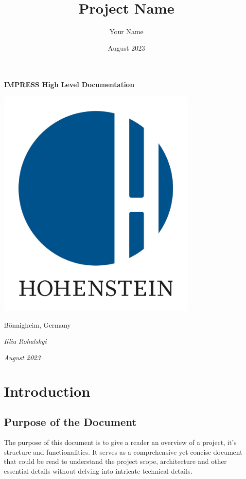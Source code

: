 \documentclass{report}
\title{Project Name}
\author{Your Name}
\date{August 2023}
\begin{document}
\begin{titlepage}
    \centerline{\Huge\textbf{IMPRESS High Level Documentation}}
    
    \vspace*{2cm}
    
    \centerline{\includegraphics[width=10cm]{hohenstein logo.jpg}}
    
    \vspace*{1.5cm}
    
    \centerline{\LARGE Bönnigheim, Germany}
    
    \vspace*{1cm}
    
    \centerline{\Large\textit{Illia Rohalskyi}}
    
    \vspace*{0.5cm}
    
    \centerline{\Large\textit{August 2023}}
    
\end{titlepage}

\tableofcontents
\chapter{Introduction}
\section{Purpose of the Document}
The purpose of this document is to give a reader an overview of a project, it's structure and functionalities. It serves as a comprehensive yet concise document that could be read to understand the project scope, architecture and other essential details without delving into intricate technical details.
\end{document}
